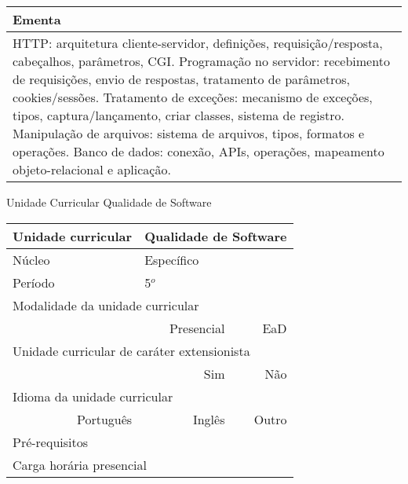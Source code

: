 \begin{quadro}[ht!]
\begin{tabular}{|p{3cm} p{2cm} p{3cm} p{2cm} p{3cm} p{2cm}|}
\multicolumn{6}{|p{15cm}|}{\cellcolor{blue1} Ementa} \\\hline
\hline\multicolumn{6}{|p{15cm}|}{\scriptsize HTTP: arquitetura cliente-servidor, definições, requisição/resposta, cabeçalhos, parâmetros, CGI. Programação no servidor: recebimento de requisições, envio de respostas, tratamento de parâmetros, cookies/sessões. Tratamento de exceções: mecanismo de exceções, tipos, captura/lançamento, criar classes, sistema de registro. Manipulação de arquivos: sistema de arquivos, tipos, formatos e operações. Banco de dados: conexão, APIs, operações, mapeamento objeto-relacional e aplicação.}\\\hline 
\hline
	\end{tabular}
\end{quadro}


\begin{quadro}[ht!]
  \centering\scriptsize
\caption{Unidade Curricular Qualidade de Software}
\begin{tabular}{|p{3cm} p{2cm} p{3cm} p{2cm} p{3cm} p{2cm}|}\hline
\multicolumn{1}{|p{3cm}|}{\cellcolor{blue1} Unidade curricular} & \multicolumn{5}{p{9cm}|}{Qualidade de Software}\\\hline
\multicolumn{1}{|p{3cm}|}{\cellcolor{blue1} Núcleo} & \multicolumn{5}{p{11.5cm}|}{Específico}\\\hline
\multicolumn{1}{|p{3cm}|}{\cellcolor{blue1} Período} & \multicolumn{5}{p{9cm}|}{5$^o$}\\\hline
\multicolumn{6}{|p{15cm}|}{\cellcolor{blue1} Modalidade da unidade curricular} \\\hline
\multicolumn{2}{|r}{		} &  \multicolumn{2}{r}{Presencial \XBox} & \multicolumn{2}{r|}{EaD \Square	} \\\hline
\multicolumn{6}{|p{15cm}|}{\cellcolor{blue1} Unidade curricular de caráter extensionista} \\\hline
\multicolumn{4}{|r}{			Sim \XBox	} & \multicolumn{2}{r|}{	Não \Square	}\\\hline
\multicolumn{6}{|p{15cm}|}{\cellcolor{blue1} Idioma da unidade curricular} \\ \hline
\multicolumn{2}{|r}{	Português \XBox	} &  \multicolumn{2}{r}{	Inglês \Square	} & \multicolumn{2}{r|}{	Outro \Square	} \\ \hline
\multicolumn{1}{|p{3cm}|}{\cellcolor{blue1} Pré-requisitos} & \multicolumn{5}{p{9cm}|}{}\\ \hline
\multicolumn{6}{|p{15cm}|}{\cellcolor{blue1} Carga horária presencial} \\ \hline

\end{tabular}
\end{quadro}
